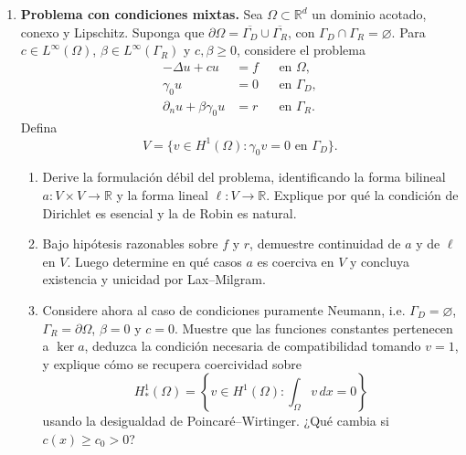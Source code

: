 \documentclass[11pt]{article}
\theoremstyle{thmstyle}
\def\R{\mathbb R}
\begin{document}
\begin{enumerate}[label=\textbf{\arabic*.}, leftmargin=*]

    \item \textbf{Problema con condiciones mixtas.} Sea $\Omega\subset\R^d$ un dominio acotado, conexo y Lipschitz. Suponga que $\partial\Omega=\overline{\Gamma_D}\cup\overline{\Gamma_R}$, con $\Gamma_D\cap\Gamma_R=\varnothing$. Para $c\in L^\infty(\Omega)$, $\beta\in L^\infty(\Gamma_R)$ y $c,\beta\ge 0$, considere el problema
    \[
    \begin{aligned}
        -\Delta u + cu &= f &&\text{en }\Omega,\\
        \gamma_0u &=0 &&\text{en }\Gamma_D,\\
        \partial_n u+\beta\gamma_0u &= r &&\text{en }\Gamma_R.
    \end{aligned}
    \]
    Defina
    \[
        V=\{v\in H^1(\Omega):\gamma_0v=0\text{ en }\Gamma_D\}.
    \]
    \begin{enumerate}[label=(\alph*)]
        \item Derive la formulaci\'on d\'ebil del problema, identificando la forma bilineal $a:V\times V\to\R$ y la forma lineal $\ell:V\to\R$. Explique por qu\'e la condici\'on de Dirichlet es esencial y la de Robin es natural.
        \item Bajo hip\'otesis razonables sobre $f$ y $r$, demuestre continuidad de $a$ y de $\ell$ en $V$. Luego determine en qu\'e casos $a$ es coerciva en $V$ y concluya existencia y unicidad por Lax--Milgram.
        \item Considere ahora al caso de condiciones puramente Neumann, i.e. $\Gamma_D=\varnothing$, $\Gamma_R=\partial\Omega$, $\beta=0$ y $c=0$. Muestre que las funciones constantes pertenecen a $\ker a$, deduzca la condici\'on necesaria de compatibilidad tomando $v=1$, y explique c\'omo se recupera coercividad sobre
        \[
            H^1_\ast(\Omega)=\left\{v\in H^1(\Omega):\int_\Omega v\,dx=0\right\}
        \]
        usando la desigualdad de Poincar\'e--Wirtinger. ¿Qu\'e cambia si $c(x)\ge c_0>0$?
    \end{enumerate}


\end{enumerate}
\end{document}
